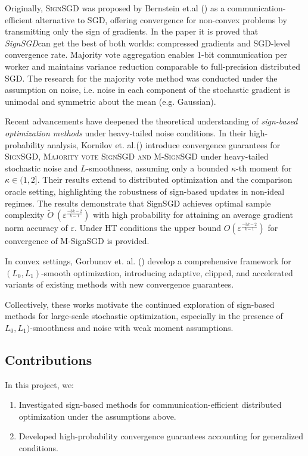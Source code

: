 \documentclass[12pt]{article}
\begin{document}
Originally, \textsc{SignSGD} was proposed by Bernstein et.al (\cite{pmlr-v80-bernstein18a}) as a communication-efficient alternative to SGD, offering convergence for non-convex problems by transmitting only the sign of gradients. In the paper it is proved that \textit{SignSGD}can get the best of both worlds: compressed gradients and SGD-level convergence rate. Majority vote aggregation enables 1-bit communication per worker and maintains variance reduction comparable to full-precision distributed SGD. The research for the majority vote method was conducted under the assumption on noise, i.e. noise in each component of the stochastic gradient is unimodal and symmetric about the mean (e.g. Gaussian).  

Recent advancements have deepened the theoretical understanding of \textit{sign-based optimization methods} under heavy-tailed noise conditions. In their high-probability analysis, Kornilov et. al.(\cite{Kornilov2025}) introduce convergence guarantees for \textsc{SignSGD, Majority vote SignSGD and M-SignSGD} under heavy-tailed stochastic noise and $L$-smoothness, assuming only a bounded $\kappa$-th moment for $\kappa \in (1,2]$. Their results extend to distributed optimization and the comparison oracle setting, highlighting the robustness of sign-based updates in non-ideal regimes. The results demonstrate that SignSGD achieves optimal sample complexity $\tilde{O}~\left(\varepsilon^\frac{−3k-2}{k−1}\right)$ with high probability for attaining an average gradient norm accuracy of $\varepsilon$. Under HT conditions the upper bound ${O}\left(\varepsilon^\frac{−3k-2}{k−1}\right)$ for convergence of M-SignSGD is provided.

In convex settings, Gorbunov et. al. (\cite{gorbunov}) develop a comprehensive framework for \((L_0, L_1)\)-smooth optimization, introducing adaptive, clipped, and accelerated variants of existing methods with new convergence guarantees. 

Collectively, these works motivate the continued exploration of sign-based methods for large-scale stochastic optimization, especially in the presence of  \(L_0, L_1)\)-smoothness and noise with weak moment assumptions.

\subsection{Contributions}
In this project, we:

\begin{enumerate}
    \item Investigated sign-based methods for communication-efficient distributed optimization under the assumptions above.
    \item Developed high-probability convergence guarantees accounting for generalized conditions.
\end{enumerate}
\end{document}
